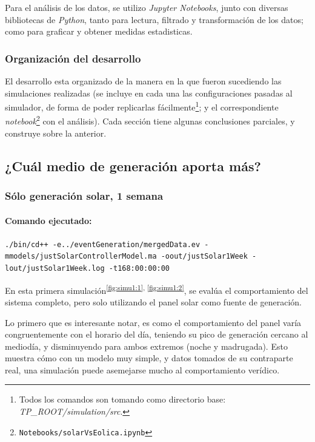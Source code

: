 Para el análisis de los datos, se utilizo \textit{Jupyter Notebooks}, junto
con diversas bibliotecas de \textit{Python}, tanto para lectura, filtrado y
transformación de los datos; como para graficar y obtener medidas
estadisticas.

\pagebreak
\subsubsection{Organización del desarrollo}
El desarrollo esta organizado de la manera en la que fueron sucediendo las
simulaciones realizadas (se incluye en cada una las configuraciones pasadas
al simulador, de forma de poder replicarlas fácilmente\footnote{Todos los
comandos son tomando como directorio base:
\textit{TP\_ROOT/simulation/src}.}; y el correspondiente \textit{notebook}\footnote{\texttt{Notebooks/solarVsEolica.ipynb}}
con el análisis). Cada sección tiene algunas conclusiones parciales, y
construye sobre la anterior.

\subsection{¿Cuál medio de generación aporta más?}

    \hypertarget{suxf3lo-generaciuxf3n-solar-1-semana}{%
\subsubsection{Sólo generación solar, 1
semana}\label{suxf3lo-generaciuxf3n-solar-1-semana}}

\hypertarget{comando-ejecutado}{%
\paragraph{Comando ejecutado:}\label{comando-ejecutado}}

\texttt{./bin/cd++ -e../eventGeneration/mergedData.ev
-mmodels/justSolarControllerModel.ma -oout/justSolar1Week
-lout/justSolar1Week.log -t168:00:00:00}

    En esta primera simulación\textsuperscript{\ref{fig:simu1:1}, \ref{fig:simu1:2}}, se evalúa el comportamiento del sistema
completo, pero solo utilizando el panel solar como fuente de generación.

Lo primero que es interesante notar, es como el comportamiento del panel
varía congruentemente con el horario del día, teniendo su pico de
generación cercano al mediodía, y disminuyendo para ambos extremos
(noche y madrugada). Esto muestra cómo con un modelo muy simple, y datos
tomados de su contraparte real, una simulación puede asemejarse mucho al
comportamiento verídico.

